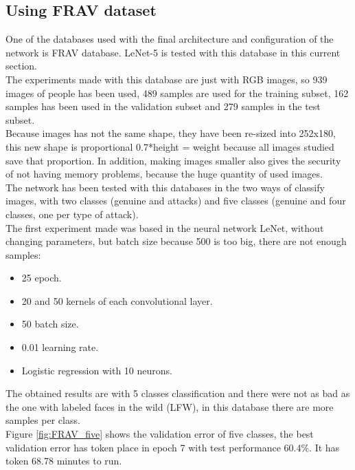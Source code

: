 \subsection{Using FRAV dataset}
One of the databases used with the final architecture and configuration of the network is FRAV database. LeNet-5 is tested with this database in this current section.\\

The experiments made with this database are just with RGB images, so 939 images of people has been used, 489 samples are used for the training subset, 162 samples has been used in the validation subset and 279 samples in the test subset.\\

Because images has not the same shape, they have been re-sized into 252x180, this new shape is proportional 0.7*height = weight because all images studied save that proportion. In addition, making images smaller also gives the security of not having memory problems, because the huge quantity of used images.\\

The network has been tested with this databases in the two ways of classify images, with two classes (genuine and attacks) and five classes (genuine and four classes, one per type of attack).\\ %

The first experiment made was based in the neural network LeNet, without changing parameters, but batch size because 500 is too big, there are not enough samples:\\

\begin{itemize}
\item 25 epoch.
\item 20 and 50 kernels of each convolutional layer.
\item 50 batch size.
\item 0.01 learning rate.
\item Logistic regression with 10 neurons.\\
\end{itemize}

The obtained results are with 5 classes classification and there were not as bad as the one with labeled faces in the wild (LFW), in this database there are more samples per class.\\

Figure \ref{fig:FRAV_five} shows the validation error of five classes, the best validation error has token place in epoch 7 with test performance 60.4\%. It has token 68.78 minutes to run.\\

